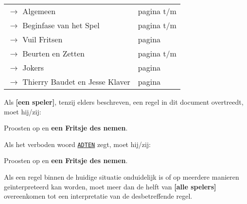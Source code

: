 \newpage
\drawBar{}


\begin{tabular}{ll}
    \large{$\rightarrow$ Algemeen} & \hspace{0.5cm} \large{pagina \pageref{sec:algemeen_start} t/m \pageref{sec:algemeen_einde}} \\
    \large{$\rightarrow$ Beginfase} van het Spel & \hspace{0.5cm} \large{pagina \pageref{sec:beginfase_start} t/m \pageref{sec:beginfase_einde}}\\
    \large{$\rightarrow$ Vuil Fritsen} & \hspace{0.5cm} \large{pagina \pageref{sec:vuil_fritsen}}\\
    \large{$\rightarrow$ Beurten en Zetten} & \hspace{0.5cm} \large{pagina \pageref{sec:beurten_en_zetten_start} t/m \pageref{sec:beurten_en_zetten_einde}} \\
    \large{$\rightarrow$ Jokers} & \hspace{0.5cm} \large{pagina \pageref{sec:jokers}}\\
    \large{$\rightarrow$ Thierry Baudet en Jesse Klaver} & \hspace{0.5cm} \large{pagina \pageref{sec:thierry}}
\end{tabular}

\label{sec:algemeen_start}
    \item Als \textbf{[een speler]}, tenzij elders beschreven, een regel in dit document overtreedt, moet hij/zij:
    \puntLijst{}
        \item Proosten op  en \textbf{een Fritsje des nemen}\footnotemark[1].
    \eindPuntLijst{}
\eindLijst{}  

\vervolgLijst{}
    \item Als \eenSpeler het verboden woord \ul{\texttt{ADTEN}} zegt, moet hij/zij:
    \puntLijst{}
    \item Proosten op  en \textbf{een Fritsje des nemen}\footnotemark[1]. 
    \eindPuntLijst{}
\eindLijst{}   

\vervolgLijst{}
    \item Als een regel binnen de huidige situatie onduidelijk is of op meerdere manieren geïnterpreteerd kan worden, moet meer dan de helft van \textbf{[alle spelers]} overeenkomen tot een interpretatie van de desbetreffende regel.
\eindLijst{}

